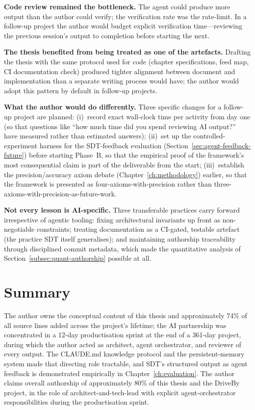 \textbf{Code review remained the bottleneck.} The agent could produce more output than the author could verify; the verification rate was the rate-limit. In a follow-up project the author would budget explicit verification time---reviewing the previous session's output to completion before starting the next.

\textbf{The thesis benefited from being treated as one of the artefacts.} Drafting the thesis with the same protocol used for code (chapter specifications, feed map, CI documentation check) produced tighter alignment between document and implementation than a separate writing process would have; the author would adopt this pattern by default in follow-up projects.

\textbf{What the author would do differently.} Three specific changes for a follow-up project are planned: (i)~record exact wall-clock time per activity from day one (so that questions like ``how much time did you spend reviewing AI output?'' have measured rather than estimated answers); (ii)~set up the controlled-experiment harness for the SDT-feedback evaluation (Section~\ref{sec:agent-feedback-future}) before starting Phase~B, so that the empirical proof of the framework's most consequential claim is part of the deliverable from the start; (iii)~establish the precision/accuracy axiom debate (Chapter~\ref{ch:methodology}) earlier, so that the framework is presented as four-axioms-with-precision rather than three-axioms-with-precision-as-future-work.

\textbf{Not every lesson is AI-specific.} Three transferable practices carry forward irrespective of agentic tooling: fixing architectural invariants up front as non-negotiable constraints; treating documentation as a CI-gated, testable artefact (the practice SDT itself generalises); and maintaining authorship traceability through disciplined commit metadata, which made the quantitative analysis of Section~\ref{subsec:quant-authorship} possible at all.

\section{Summary}
\label{sec:ai-summary}

The author owns the conceptual content of this thesis and approximately 74\% of all source lines added across the project's lifetime; the AI partnership was concentrated in a 12-day productisation sprint at the end of a 361-day project, during which the author acted as architect, agent orchestrator, and reviewer of every output. The CLAUDE.md knowledge protocol and the persistent-memory system made that directing role tractable, and SDT's structured output as agent feedback is demonstrated empirically in Chapter~\ref{ch:evaluation}. The author claims overall authorship of approximately 80\% of this thesis and the DriveBy project, in the role of architect-and-tech-lead with explicit agent-orchestrator responsibilities during the productisation sprint.
